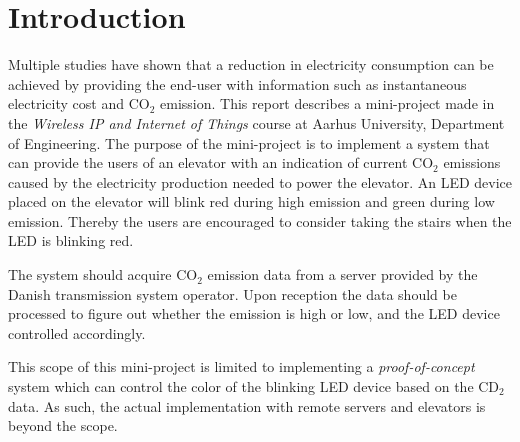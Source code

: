 \documentclass[Main]{subfiles}
\begin{document}
\section{Introduction} %
\label{sec:introduction}
	Multiple studies have shown that a reduction in electricity consumption can be achieved by providing the end-user with information such as instantaneous electricity cost and CO$_2$ emission\cite{Tricascade:2009:Online}. 
	This report describes a mini-project made in the \emph{Wireless IP and Internet of Things} course at Aarhus University, Department of Engineering. 
	The purpose of the mini-project is to implement a system that can provide the users of an elevator with an indication of current CO$_2$ emissions caused by the electricity production needed to power the elevator. 
	An LED device placed on the elevator will blink red during high emission and green during low emission. 
	Thereby the users are encouraged to consider taking the stairs when the LED is blinking red. 

	The system should acquire CO$_2$ emission data from a server provided by the Danish transmission system operator. 
	Upon reception the data should be processed to figure out whether the emission is high or low, and the LED device controlled accordingly.

	This scope of this mini-project is limited to implementing a \emph{proof-of-concept} system which can control the color of the blinking LED device based on the CD$_2$ data.
	As such, the actual implementation with remote servers and elevators is beyond the scope.



\end{document}
